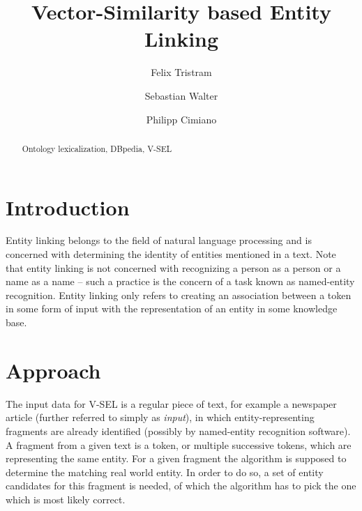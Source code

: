 \documentclass[runningheads,a4paper]{llncs}
\newcommand{\keywords}[1]{\par\addvspace\baselineskip
\noindent\keywordname\enspace\ignorespaces#1}
\begin{document}
\mainmatter  %

\newcommand{\acronym}{V-SEL}



\title{Vector-Similarity based Entity Linking}

\author{Felix Tristram \and Sebastian Walter \and Philipp Cimiano}



\maketitle


\begin{abstract}


\keywords{Ontology lexicalization, DBpedia, \acronym{}}
\end{abstract}

\section{Introduction}\label{sec:introduction}
Entity linking belongs to the field of natural language processing and is concerned with determining the identity of entities mentioned in a text. Note that entity linking is not concerned with recognizing a person as a person or a name as a name -- such a practice is the concern of a task known as named-entity recognition. Entity linking only refers to creating an association between a token in some form of input with the representation of an entity in some knowledge base.


\section{Approach}\label{sec:approach}
The input data for {\acronym} is a regular piece of text, for example a newspaper article (further referred to simply as \textit{input}), in which entity-representing fragments are already identified (possibly by named-entity recognition software). A fragment from a given text is a token, or multiple successive tokens, which are representing the same entity. For a given fragment the algorithm is supposed to determine the matching real world entity. In order to do so, a set of entity candidates for this fragment is needed, of which the algorithm has to pick the one which is most likely correct. 
\end{document}
